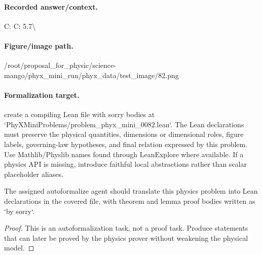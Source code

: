 \paragraph{Recorded answer/context.}
C: C: 5.7\textbackslash{}

\paragraph{Figure/image path.}
/root/proposal\_for\_physic/science-mango/phyx\_mini\_run/phyx\_data/test\_image/82.png

\paragraph{Formalization target.}
create a compiling Lean file with sorry bodies at `PhyXMiniProblems/problem\_phyx\_mini\_0082.lean`. The Lean declarations must preserve the physical quantities, dimensions or dimensional roles, figure labels, governing-law hypotheses, and final relation expressed by this problem.
Use Mathlib/Physlib names found through LeanExplore where available. If a physics API is missing, introduce faithful local abstractions rather than scalar placeholder aliases.

\begin{theorem}
\label{thm:physics:phyx_mini_0082:target}
The assigned autoformalize agent should translate this physics problem into Lean declarations in the covered file, with theorem and lemma proof bodies written as `by sorry`.
\end{theorem}
\begin{proof}
This is an autoformalization task, not a proof task. Produce statements that can later be proved by the physics prover without weakening the physical model.
\end{proof}

